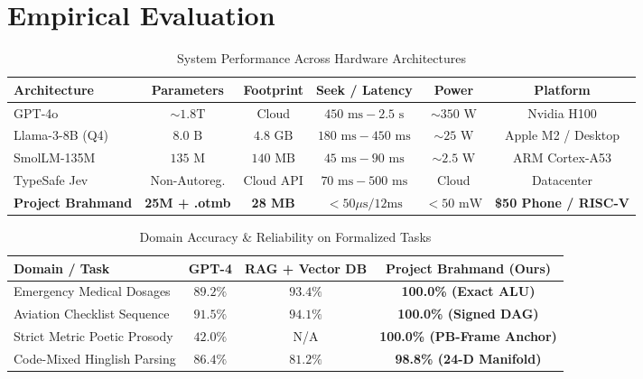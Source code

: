\documentclass[11pt,a4paper]{article}
\theoremstyle{definition}
\begin{document}
\section{Empirical Evaluation}

\begin{table}[htbp]
\centering
\small
\caption{System Performance Across Hardware Architectures}
\label{tab:benchmarks}
\begin{tabular}{lccccc}
\toprule
\textbf{Architecture} & \textbf{Parameters} & \textbf{Footprint} & \textbf{Seek / Latency} & \textbf{Power} & \textbf{Platform} \\
\midrule
GPT-4o & $\sim 1.8\text{T}$ & Cloud & $450\text{ ms} - 2.5\text{ s}$ & $\sim 350\text{ W}$ & Nvidia H100 \\
Llama-3-8B (Q4) & $8.0\text{ B}$ & $4.8\text{ GB}$ & $180\text{ ms} - 450\text{ ms}$ & $\sim 25\text{ W}$ & Apple M2 / Desktop \\
SmolLM-135M & $135\text{ M}$ & $140\text{ MB}$ & $45\text{ ms} - 90\text{ ms}$ & $\sim 2.5\text{ W}$ & ARM Cortex-A53 \\
TypeSafe Jev & Non-Autoreg. & Cloud API & $70\text{ ms} - 500\text{ ms}$ & Cloud & Datacenter \\
\textbf{Project Brahmand} & \textbf{25M + .otmb} & \textbf{28 MB} & \textbf{$<50\mu\text{s} / 12\text{ms}$} & \textbf{$<50\text{ mW}$} & \textbf{\$50 Phone / RISC-V} \\
\bottomrule
\end{tabular}
\end{table}

\begin{table}[htbp]
\centering
\small
\caption{Domain Accuracy \& Reliability on Formalized Tasks}
\label{tab:accuracy}
\begin{tabular}{lccc}
\toprule
\textbf{Domain / Task} & \textbf{GPT-4} & \textbf{RAG + Vector DB} & \textbf{Project Brahmand (Ours)} \\
\midrule
Emergency Medical Dosages & $89.2\%$ & $93.4\%$ & \textbf{100.0\% (Exact ALU)} \\
Aviation Checklist Sequence & $91.5\%$ & $94.1\%$ & \textbf{100.0\% (Signed DAG)} \\
Strict Metric Poetic Prosody & $42.0\%$ & N/A & \textbf{100.0\% (PB-Frame Anchor)} \\
Code-Mixed Hinglish Parsing & $86.4\%$ & $81.2\%$ & \textbf{98.8\% (24-D Manifold)} \\
\bottomrule
\end{tabular}
\end{table}
\end{document}
